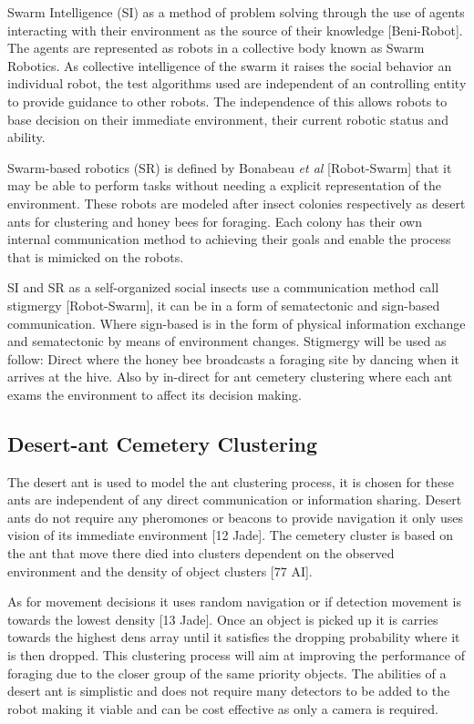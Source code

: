 \documentclass[12pt]{article}
\begin{document}
\par{Swarm Intelligence (SI) as a method of problem solving through the use of agents interacting with their environment as the source of their knowledge [Beni-Robot]. The agents are represented as robots in a collective body known as Swarm Robotics. As collective intelligence of the swarm it raises the social behavior an individual robot, the test algorithms used are independent of an controlling entity to provide guidance to other robots. The independence of this allows robots to base decision on their immediate environment, their current robotic status and ability.}

\par{Swarm-based robotics (SR) is defined by Bonabeau \textit{et al} [Robot-Swarm] that it may be able to perform tasks without needing a explicit representation of the environment. These robots are modeled after insect colonies respectively as desert ants for clustering and honey bees for foraging. Each colony has their own internal communication method to achieving their goals and enable the process that is mimicked on the robots.}

\par{SI and SR as a self-organized social insects use a communication method call stigmergy [Robot-Swarm], it can be in a form of sematectonic and sign-based communication. Where sign-based is in the form of physical information exchange and sematectonic by means of environment changes. Stigmergy will be used as follow: Direct where the honey bee broadcasts a foraging site by dancing when it arrives at the hive. Also by in-direct for ant cemetery clustering where each ant exams the environment to affect its decision making.}

\subsection{Desert-ant Cemetery Clustering}

\par{The desert ant is used to model the ant clustering process, it is chosen for these ants are independent of any direct communication or information sharing. Desert ants do not require any pheromones or beacons to provide navigation it only uses vision of its immediate environment [12 Jade]. The cemetery cluster is based on the ant that move there died into clusters dependent on the observed environment and the density of object clusters [77 AI].}

\par{As for movement decisions it uses random navigation or if detection movement is towards the lowest density [13 Jade]. Once an object is picked up it is carries towards the highest dens array until it satisfies the dropping probability where it is then dropped.  This clustering process will aim at improving the performance of foraging due to the closer group of the same priority objects. The abilities of a desert ant is simplistic and does not require many detectors to be added to the robot making it viable and can be cost effective as only a camera is required.}
\end{document}
